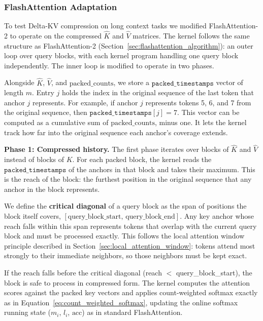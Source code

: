 \subsubsection{FlashAttention Adaptation}
\label{sec:flash_attention_adaptation}

To test Delta-KV compression on long context tasks we modified FlashAttention-2 to operate on the compressed $\hat{K}$ and $\hat{V}$ matrices. The kernel follows the same structure as FlashAttention-2 (Section~\ref{sec:flashattention_algorithm}): an outer loop over query blocks, with each kernel program handling one query block independently. The inner loop is modified to operate in two phases.

Alongside $\hat{K}$, $\hat{V}$, and $\text{packed\_counts}$, we store a $\texttt{packed\_timestamps}$ vector of length $m$. Entry $j$ holds the index in the original sequence of the last token that anchor $j$ represents. For example, if anchor $j$ represents tokens 5, 6, and 7 from the original sequence, then $\texttt{packed\_timestamps}[j] = 7$. This vector can be computed as a cumulative sum of $\text{packed\_counts}$, minus one. It lets the kernel track how far into the original sequence each anchor's coverage extends.

\textbf{Phase 1: Compressed history.} The first phase iterates over blocks of $\hat{K}$ and $\hat{V}$ instead of blocks of $K$. For each packed block, the kernel reads the $\texttt{packed\_timestamps}$ of the anchors in that block and takes their maximum. This is the reach of the block: the furthest position in the original sequence that any anchor in the block represents.

We define the \textbf{critical diagonal} of a query block as the span of positions the block itself covers, $[\text{query\_block\_start},\, \text{query\_block\_end}]$. Any key anchor whose reach falls within this span represents tokens that overlap with the current query block and must be processed exactly. This follows the local attention window principle described in Section~\ref{sec:local_attention_window}: tokens attend most strongly to their immediate neighbors, so those neighbors must be kept exact.

If the reach falls before the critical diagonal (reach $<$ query\_block\_start), the block is safe to process in compressed form. The kernel computes the attention scores against the packed key vectors and applies count-weighted softmax exactly as in Equation~\ref{eq:count_weighted_softmax}, updating the online softmax running state ($m_i$, $l_i$, $\text{acc}$) as in standard FlashAttention.

